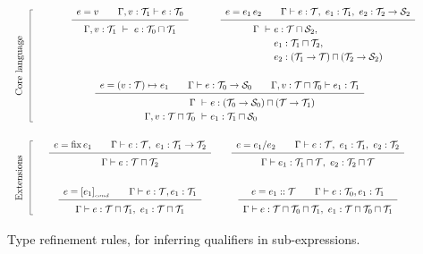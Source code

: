 \begin{figure*}
\newcommand\typerule[2]{{\renewcommand\arraystretch{1.5}\begin{array}[t]{c} #1 \\ \hline #2 \end{array}}}
\[
\renewcommand\arraystretch{3}
\begin{array}{cccp{1cm}}
  \multirow{2}{1cm}[-2em]{\begin{tikzpicture}\draw (0,0) -- ++(-1mm,0) -- ++(0,-11.7em) {} node[midway,anchor=base,xshift=-3mm,rotate=90] {Core language} -- ++(1mm,0);\end{tikzpicture}} &
  \typerule{e=v \qquad \Gamma,v:\T_1\vdash e:\T_0}
           {\Gamma,v:\T_1 ~\vdash~ e:\T_0\sqcap\T_1} &
  \typerule{e=e_1\,e_2 \qquad \Gamma \vdash e:\T, ~ e_1:\T_1, ~ e_2:\T_2\to\S_2}
           {\renewcommand\arraystretch{1.2}
            \begin{array}[t]{@{}l@{}l@{}}
              \Gamma ~\vdash~ & e:\T\sqcap\S_2, \\ 
                              & e_1:\T_1\sqcap\T_2, \\
                              & e_2:(\T_1\to\T)\sqcap(\T_2\to\S_2)
            \end{array}} & \\
  &
  \cspan2{
  \typerule{e=(v:\T)\mapsto e_1 \qquad \Gamma\vdash e:\T_0\to\S_0 \qquad \Gamma,v:\T\sqcap\T_0\vdash e_1:\T_1}
           {\renewcommand\arraystretch{1.2}
            \begin{array}[t]{r@{}l}
              \Gamma ~\vdash~ & e:(\T_0\to\S_0)\sqcap(\T\to\T_1)\\
              \Gamma,v:\T\sqcap\T_0 ~\vdash~ & e_1:\T_1\sqcap\S_0 
            \end{array}}  } & \\
  \multirow{2}{1cm}[-1.8em]{\begin{tikzpicture}\draw (0,0) -- ++(-1mm,0) -- ++(0,-7.7em) node[midway,anchor=base,xshift=-3mm,rotate=90] {Extensions} -- ++(1mm,0);\end{tikzpicture}} &
  \typerule{e=\fix e_1 \qquad \Gamma\vdash e:\T, ~ e_1:\T_1\to\T_2}          %
           {\Gamma\vdash e: \T\sqcap\T_2} &
  \typerule{e=e_1/e_2 \qquad \Gamma\vdash e:\T, ~ e_1:\T_1, ~ e_2:\T_2}      %
           {\renewcommand\arraystretch{1.2}
            \begin{array}[t]{@{}l@{}l@{}}
              \Gamma\vdash{} & e_1:\T_1\sqcap\T, ~ e_2:\T_2\sqcap\T
            \end{array}} & \\
  &
  \typerule{e=[e_1]_{_{cond}} \qquad \Gamma\vdash e:\T,e_1:\T_1}                           %
           {\Gamma\vdash e:\T\sqcap\T_1, ~ e_1:\T\sqcap\T_1} &
  \typerule{e=e_1::\T \qquad \Gamma\vdash e:\T_0,e_1:\T_1}                           %
           {\Gamma\vdash e:\T\sqcap\T_0\sqcap\T_1, ~ e_1:\T\sqcap\T_0\sqcap\T_1}
\end{array}
\]
\caption{\label{lang:type refinement rules}
  Type refinement rules, for inferring qualifiers in sub-expressions.}
\end{figure*}

